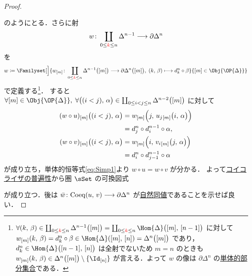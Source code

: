 \documentclass[TQFT_main]{subfiles}
\begin{document}
\begin{proof}
\begin{center}
    \end{center}
    のようにとる．さらに射
    \begin{align}
        w \colon \coprod_{0 \le \textcolor{red}{k} \le n} \Delta^{n-1} \longrightarrow \partial \Delta^n
    \end{align}
    を
    \begin{align}
        w \coloneqq \Familyset[\Big]{w_{[m]} \colon \coprod_{0 \le \textcolor{red}{k} \le n} \Delta^{n-1} \bigl( [m] \bigr) \lto \partial \Delta^n \bigl( [m] \bigr),\; (k,\, \beta) \lmto d^n_k \circ \beta  }{[m] \in \Obj{\OP{\Delta}}}
    \end{align}
    で定義する\footnote{$\forall (k,\, \beta) \in  \coprod_{0 \le \textcolor{red}{k} \le n} \Delta^{n-1} \bigl( [m] \bigr)  =  \coprod_{0 \le \textcolor{red}{k} \le n} \Hom{\Delta}\bigl( [m],\, [n-1] \bigr)$ に対して $w_{[m]}(k,\, \beta) = d^n_k \circ \beta \in \Hom{\Delta}([m],\, [n]) = \Delta^n \bigl( [m] \bigr)$ であり，$d^n_k \in \Hom{\Delta}\bigl( [n-1],\, [n] \bigr)$ は全射でないため $m=n$ のときも $w_{[m]}(k,\, \beta) \in \Delta^n \bigl( [m] \bigr) \setminus \{\Id_{[n]}\}$ が言える．よって $w$ の像は $\partial \Delta^n$ の\hyperref[def:SimpSet]{単体的部分集合}である．}．
    すると $\forall [m] \in \Obj{\OP{\Delta}},\; \forall \bigl( (i<j),\, \alpha \bigr) \in \coprod_{0 \le i < j \le n} \Delta^{n-2}\bigl( [m] \bigr)$ に対して
    \begin{align}
        (w \circ u)_{[m]} \bigl( (i<j),\, \alpha \bigr)
        &= w_{[m]} \Bigl(j,\, u_j{}_{[m]} \bigl( i,\, \alpha \bigr) \Bigr) \\
        &= d^n_j \circ d^{n-1}_i \circ \alpha, \\
        (w \circ v)_{[m]} \bigl( (i<j),\, \alpha \bigr) 
        &= w_{[m]} \Bigl( i,\, v_i{}_{[m]} \bigl( j,\, \alpha \bigr)  \Bigr) \\
        &= d^n_i \circ d^{n-1}_{j-1} \circ \alpha
    \end{align}
    が成り立ち，単体的恒等式\eqref{eq:Simp1}より $w \circ u = w \circ v$ が分かる．
    よって\hyperref[def:eq-coeq]{コイコライザの普遍性}から圏 $\sSet$ の可換図式
    \begin{center}
    \end{center}
    が成り立つ．後は $\bar{w} \colon \mathrm{Coeq}(u,\, v) \longrightarrow \partial \Delta^n$ が\hyperref[def:nat]{自然同値}であることを示せば良い．


\end{proof}
\end{document}
